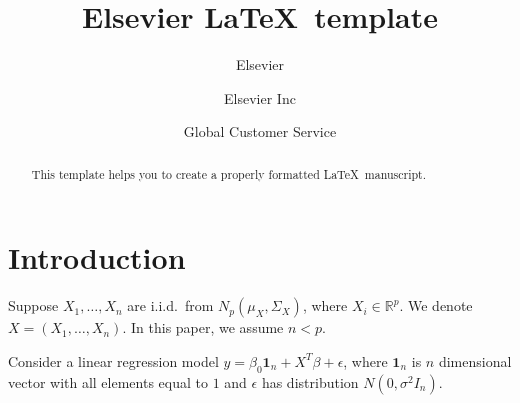 \documentclass[review]{elsarticle}
\theoremstyle{plain}
\theoremstyle{definition}
\theoremstyle{remark}
\begin{document}
\begin{frontmatter}

\title{Elsevier \LaTeX\ template}

\author{Elsevier}
\address{Radarweg 29, Amsterdam}

\author[mymainaddress,mysecondaryaddress]{Elsevier Inc}

\author[mysecondaryaddress]{Global Customer Service}

\address[mymainaddress]{1600 John F Kennedy Boulevard, Philadelphia}
\address[mysecondaryaddress]{360 Park Avenue South, New York}

\begin{abstract}
This template helps you to create a properly formatted \LaTeX\ manuscript.
\end{abstract}

\begin{keyword}
\end{keyword}

\end{frontmatter}


\section{Introduction}
Suppose $X_1,\ldots,X_n$ are i.i.d.\ from $N_{p}(\mu_X,\Sigma_X)$,
where $X_i\in \mathbb{R}^p$. 
We denote $X=(X_1,\ldots,X_n)$.
In this paper, we assume $n<p$.

Consider a linear regression model $y=\beta_0 \textbf{1}_n+X^T \beta+\epsilon$, where $\textbf{1}_n$ is $n$ dimensional vector with all elements equal to $1$ and $\epsilon$ has distribution $N(0,\sigma^2 I_n)$.
\end{document}
